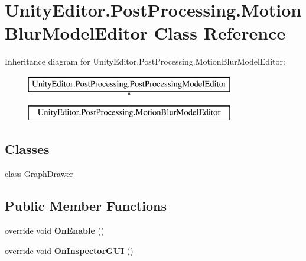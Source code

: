 \hypertarget{class_unity_editor_1_1_post_processing_1_1_motion_blur_model_editor}{}\section{Unity\+Editor.\+Post\+Processing.\+Motion\+Blur\+Model\+Editor Class Reference}
\label{class_unity_editor_1_1_post_processing_1_1_motion_blur_model_editor}
Inheritance diagram for Unity\+Editor.\+Post\+Processing.\+Motion\+Blur\+Model\+Editor\+:\begin{figure}[H]
\begin{center}
\leavevmode
\includegraphics[height=2.000000cm]{class_unity_editor_1_1_post_processing_1_1_motion_blur_model_editor}
\end{center}
\end{figure}
\subsection*{Classes}
\begin{DoxyCompactItemize}
\item 
class \hyperlink{class_unity_editor_1_1_post_processing_1_1_motion_blur_model_editor_1_1_graph_drawer}{Graph\+Drawer}
\end{DoxyCompactItemize}
\subsection*{Public Member Functions}
\begin{DoxyCompactItemize}
\item 
\mbox{\label{class_unity_editor_1_1_post_processing_1_1_motion_blur_model_editor_a3cc4895e7a3e5aa942b94c6f4ff1126a}} 
override void {\bfseries On\+Enable} ()
\item 
\mbox{\label{class_unity_editor_1_1_post_processing_1_1_motion_blur_model_editor_ab747616bf4f9492da7e18ea96f9f0360}} 
override void {\bfseries On\+Inspector\+G\+UI} ()
\end{DoxyCompactItemize}
